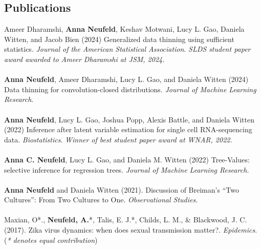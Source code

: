 \documentclass[margin, 10pt]{res}
\begin{document}
\begin{resume}
\section{Publications} 
Ameer Dharamshi, \textbf{Anna Neufeld}, Keshav Motwani, Lucy L. Gao, Daniela Witten, and Jacob Bien (2024) Generalized data thinning using sufficient statistics. \emph{Journal of the American Statistical Association}. \emph{SLDS student paper award awarded to Ameer Dharamshi at JSM, 2024.}  \\
\\
\textbf{Anna Neufeld}, Ameer Dharamshi, Lucy L. Gao, and Daniela Witten (2024) Data thinning for convolution-closed distributions. \emph{Journal of Machine Learning Research}. \\
\\
\textbf{Anna Neufeld}, Lucy L. Gao, Joshua Popp, Alexis Battle, and Daniela Witten (2022) Inference after latent variable estimation for single cell RNA-sequencing data. \emph{Biostatistics}. \emph{Winner of best student paper award at WNAR, 2022.}  \\
\\
\textbf{Anna C. Neufeld}, Lucy L. Gao, and Daniela M. Witten (2022) Tree-Values: selective inference for regression trees. \emph{Journal of Machine Learning Research.}\\
\\
\textbf{Anna Neufeld} and Daniela Witten (2021). Discussion of Breiman’s “Two Cultures”: From Two Cultures to One. \emph{Observational Studies}.  \\
\\
Maxian, O*., \textbf{Neufeld, A.}*, Talis, E. J.*, Childs, L. M., \& Blackwood, J. C. (2017). Zika virus dynamics: when does sexual transmission matter?. \emph{Epidemics}. \\
\small
(\emph{* denotes equal contribution})
\normalsize


\end{resume}
\end{document}
